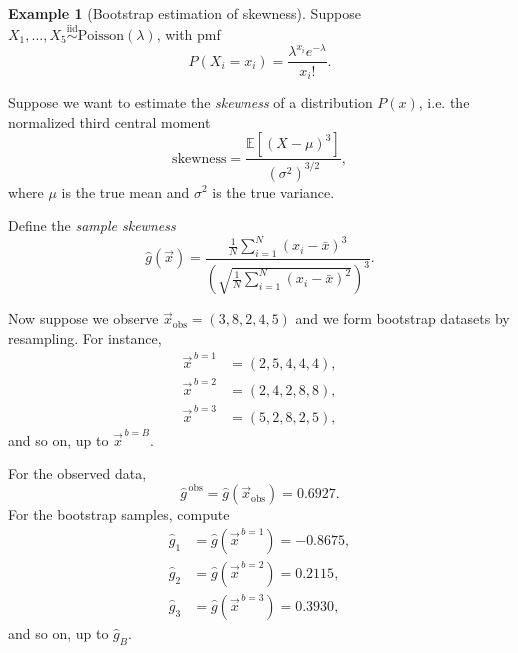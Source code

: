 \documentclass[11pt, titlepage]{article} %
\numberwithin{equation}{section}
\theoremstyle{definition}
\newtheorem*{example*}{Example}
\numberwithin{assumption}{section}
\begin{document}
\begin{example*}[Bootstrap estimation of skewness]
Suppose $X_1,\dots,X_5 \overset{\mathrm{iid}}{\sim} \mathrm{Poisson}(\lambda)$, with pmf
\begin{equation*}
    P(X_i=x_i)=\frac{\lambda^{x_i}e^{-\lambda}}{x_i!}.
\end{equation*}

Suppose we want to estimate the \textit{skewness} of a distribution $P(x)$, i.e. the normalized third central moment
\begin{equation*}
    \mathrm{skewness}
    =
    \frac{\mathbb{E}\!\left[(X-\mu)^3\right]}{(\sigma^2)^{3/2}},
\end{equation*}
where $\mu$ is the true mean and $\sigma^2$ is the true variance.

Define the \textit{sample skewness}
\begin{equation*}
    \hat g(\vec x)
    =
    \frac{\frac{1}{N}\sum_{i=1}^N (x_i-\bar x)^3}
    {\left(\sqrt{\frac{1}{N}\sum_{i=1}^N (x_i-\bar x)^2}\right)^3}.
\end{equation*}

Now suppose we observe $\vec x_{\mathrm{obs}}=(3,8,2,4,5)$ and we form bootstrap datasets by resampling. For instance,
\begin{align*}
    \vec x^{\,b=1} &= (2,5,4,4,4),\\
    \vec x^{\,b=2} &= (2,4,2,8,8),\\
    \vec x^{\,b=3} &= (5,2,8,2,5),
\end{align*}
and so on, up to $\vec x^{\,b=B}$.

For the observed data,
\begin{equation*}
    \hat g^{\,\mathrm{obs}}
    =
    \hat g(\vec x_{\mathrm{obs}})
    =
    0.6927.
\end{equation*}
For the bootstrap samples, compute
\begin{align*}
    \hat g_1 &= \hat g(\vec x^{\,b=1}) = -0.8675,\\
    \hat g_2 &= \hat g(\vec x^{\,b=2}) = 0.2115,\\
    \hat g_3 &= \hat g(\vec x^{\,b=3}) = 0.3930,
\end{align*}
and so on, up to $\hat g_B$.


\end{example*}
\end{document}
